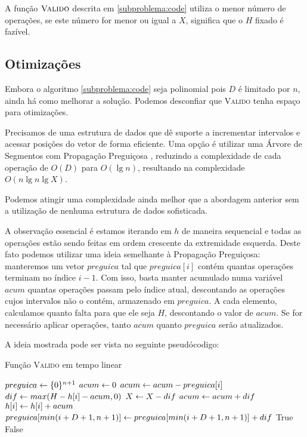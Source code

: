 A função $\textsc{Valido}$ descrita em \ref{subproblema:code} utiliza o menor número de operações, se este número for menor ou igual a $X$, significa que o $H$ fixado é fazível.

\subsection{Otimizações}

Embora o algoritmo \ref{subproblema:code} seja polinomial pois $D$ é limitado por $n$, ainda há como melhorar a solução. Podemos desconfiar que \textsc{Valido} tenha espaço para otimizações. 

Precisamos de uma estrutura de dados que dê suporte a incrementar intervalos e acessar posições do vetor de forma eficiente. Uma opção é utilizar uma Árvore de Segmentos com Propagação Preguiçosa \cite{matheusmso}, reduzindo a complexidade de cada operação de $O(D)$ para $O(\lg n)$, resultando na complexidade $O(n \lg n \lg X)$.

Podemos atingir uma complexidade ainda melhor que a abordagem anterior sem a utilização de nenhuma estrutura de dados sofisticada.

A observação essencial é estamos iterando em $h$ de maneira sequencial e todas as operações estão sendo feitas em ordem crescente da extremidade esquerda. Deste fato podemos utilizar uma ideia semelhante à Propagação Preguiçosa: manteremos um vetor $preguica$ tal que $preguica[i]$ contém quantas operações terminam no índice $i - 1$. Com isso, basta manter acumulado numa variável $acum$ quantas operações passam pelo índice atual, descontando as operações cujos intervalos não o contém, armazenado em $preguica$. A cada elemento, calculamos quanto falta para que ele seja $H$, descontando o valor de $acum$. Se for necessário aplicar operações, tanto $acum$ quanto $preguica$ serão atualizados.

A ideia mostrada pode ser vista no seguinte pseudócodigo:

\begin{algorithm}[H]
\caption{Função \textsc{Valido} em tempo linear}
\label{subproblema:code_linear}
\begin{algorithmic}[1]
    \State $preguica \leftarrow \{0\}^{n + 1}$
    \State $acum \leftarrow 0$
        \State $acum \leftarrow acum - preguica[i]$
        \State $dif \leftarrow max(H - h[i] - acum, 0)$
        \State $X \leftarrow X - dif$
        \State $acum \leftarrow acum + dif$
        \State $h[i] \leftarrow h[i] + acum$
        \State $preguica[min(i + D + 1, n + 1)] \leftarrow preguica[min(i + D + 1, n + 1)] + dif$
    \EndFor
        \State \Return True
    \Else
        \State \Return False
    \EndIf
\EndFunction
\end{algorithmic}
\end{algorithm}

